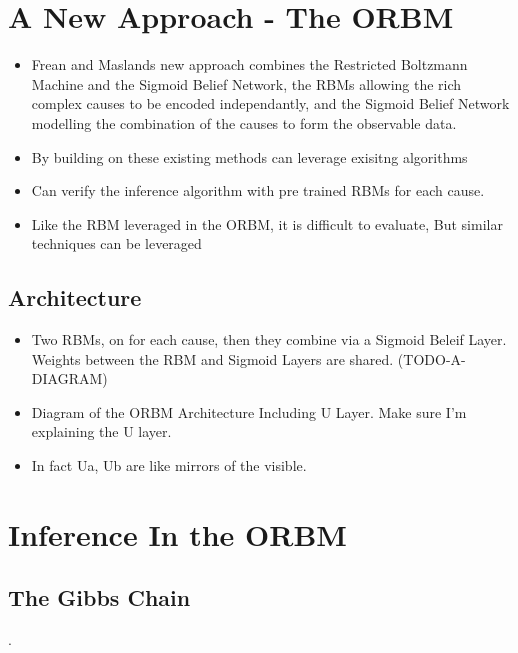 \section{A New Approach - The ORBM}

\begin{itemize}
  \item Frean and Maslands new approach combines the Restricted Boltzmann Machine and the Sigmoid Belief Network, the RBMs allowing the rich complex causes to be encoded independantly, and the Sigmoid Belief Network modelling the combination of the causes to form the observable data.
  \item By building on these existing methods can leverage exisitng algorithms
  \item Can verify the inference algorithm with pre trained RBMs for each cause. 
  \item Like the RBM leveraged in the ORBM, it is difficult to evaluate, But similar techniques can be leveraged
\end{itemize}

\subsection{Architecture}

\begin{itemize}
    \item Two RBMs, on for each cause, then they combine via a Sigmoid Beleif Layer. Weights between the RBM and Sigmoid Layers are shared. (TODO-A-DIAGRAM)
    \item Diagram of the ORBM Architecture Including U Layer. Make sure I'm explaining the U layer.
    \item In fact Ua, Ub are like mirrors of the visible.
\end{itemize}


\section{Inference In the ORBM }

\subsection{The Gibbs Chain}

.

